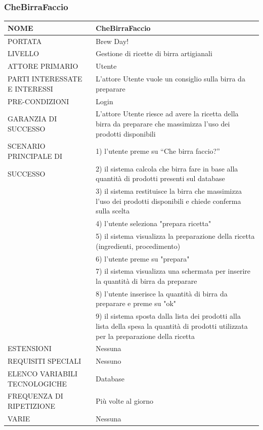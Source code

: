 \documentclass[a4paper, titlepage]{article}
\begin{document}
\subsubsection{CheBirraFaccio}
\begin{longtable}{p{6cm}p{7cm}}\toprule
    NOME & CheBirraFaccio\\\midrule
    PORTATA & Brew Day!\\\midrule
    LIVELLO & Gestione di ricette di birra artigianali\\\midrule
    ATTORE PRIMARIO & Utente\\\midrule
    PARTI INTERESSATE E INTERESSI &
    L’attore Utente vuole un consiglio sulla birra da preparare\\\midrule
    PRE-CONDIZIONI & Login\\\midrule
    GARANZIA DI SUCCESSO &L’attore Utente riesce ad avere la ricetta della birra da preparare che massimizza l’uso dei prodotti disponibili\\\midrule
    SCENARIO PRINCIPALE DI
    & 1) l’utente preme su “Che birra faccio?”\\
    SUCCESSO & 2) il sistema calcola che birra fare in base alla quantità di prodotti presenti sul database\\
    & 3) il sistema restituisce la birra che massimizza l’uso dei prodotti disponibili e chiede conferma sulla scelta\\
    & 4) l'utente seleziona "prepara ricetta"\\
    & 5) il sistema visualizza la preparazione della ricetta (ingredienti, procedimento)\\
    & 6) l'utente preme su "prepara"\\
    & 7) il sistema visualizza una schermata per inserire la quantità di birra da preparare\\
    & 8) l'utente inserisce la quantità di birra da preparare e preme su "ok"\\
    & 9) il sistema sposta dalla lista dei prodotti alla lista della spesa la quantità di prodotti utilizzata per la preparazione della ricetta\\\midrule
    ESTENSIONI & Nessuna\\\midrule
    REQUISITI SPECIALI & Nessuno\\\midrule
    ELENCO VARIABILI TECNOLOGICHE & Database\\\midrule
    FREQUENZA DI RIPETIZIONE & Più volte al giorno\\\midrule
    VARIE & Nessuna\\\bottomrule
\end{longtable}
\end{document}
